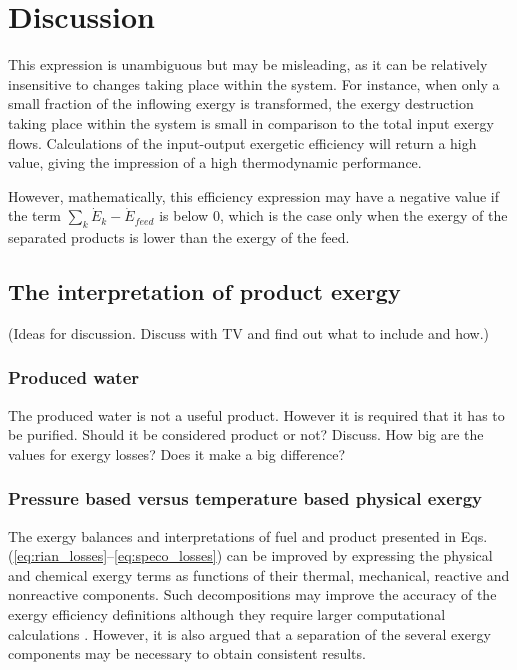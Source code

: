 \section{Discussion}
\label{sec:discussion}

This expression is unambiguous but may be misleading, as it can be relatively insensitive to changes taking place within the system. For instance, when only a small fraction of the inflowing exergy is transformed, the exergy destruction taking place within the system is small in comparison to the total input exergy flows. Calculations of the input-output exergetic efficiency will return a high value, giving the impression of a high thermodynamic performance.

However, mathematically, this efficiency expression may have a negative value if the term $\sum_k\dot{E}_k-\dot{E}_{feed}$ is below 0, which is the case only when the exergy of the separated products is lower than the exergy of the feed. 

\subsection{The interpretation of product exergy}
(Ideas for discussion. Discuss with TV and find out what to include and how.)

\subsubsection{Produced water}
The produced water is not a useful product. However it is required that it has to be purified. Should it be considered product or not? Discuss. How big are the values for exergy losses? Does it make a big difference?


\subsubsection{Pressure based versus temperature based physical exergy}

The exergy balances and interpretations of fuel and product presented in Eqs.(\ref{eq:rian_losses}--\ref{eq:speco_losses}) can be improved by expressing the physical and chemical exergy terms as functions of their thermal, mechanical, reactive and nonreactive components. Such decompositions may improve the accuracy of the exergy efficiency definitions although they require larger computational calculations \cite{Lazzaretto1999,Lazzaretto2006}. However, it is also argued that a separation of the several exergy components may be necessary to obtain consistent results.    

